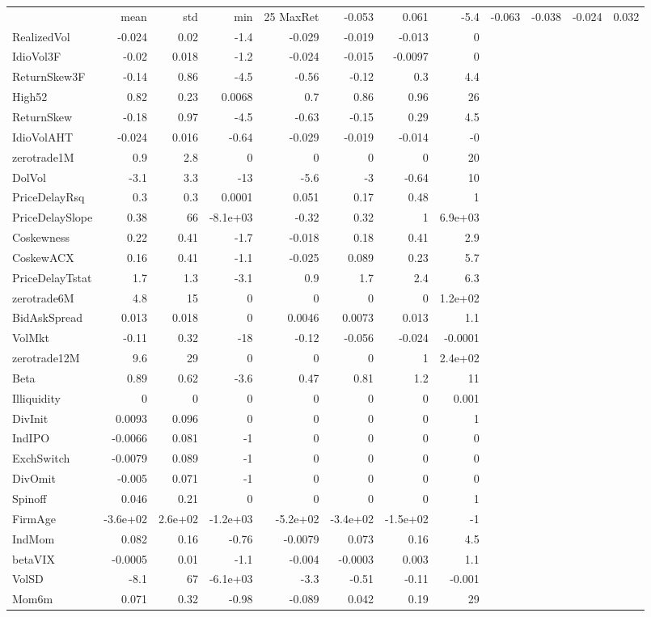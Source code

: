 \begin{tabular}{lrrrrrrr}
 & mean & std & min & 25%
MaxRet & -0.053 & 0.061 & -5.4 & -0.063 & -0.038 & -0.024 & 0.032 \\
RealizedVol & -0.024 & 0.02 & -1.4 & -0.029 & -0.019 & -0.013 & 0 \\
IdioVol3F & -0.02 & 0.018 & -1.2 & -0.024 & -0.015 & -0.0097 & 0 \\
ReturnSkew3F & -0.14 & 0.86 & -4.5 & -0.56 & -0.12 & 0.3 & 4.4 \\
High52 & 0.82 & 0.23 & 0.0068 & 0.7 & 0.86 & 0.96 & 26 \\
ReturnSkew & -0.18 & 0.97 & -4.5 & -0.63 & -0.15 & 0.29 & 4.5 \\
IdioVolAHT & -0.024 & 0.016 & -0.64 & -0.029 & -0.019 & -0.014 & -0 \\
zerotrade1M & 0.9 & 2.8 & 0 & 0 & 0 & 0 & 20 \\
DolVol & -3.1 & 3.3 & -13 & -5.6 & -3 & -0.64 & 10 \\
PriceDelayRsq & 0.3 & 0.3 & 0.0001 & 0.051 & 0.17 & 0.48 & 1 \\
PriceDelaySlope & 0.38 & 66 & -8.1e+03 & -0.32 & 0.32 & 1 & 6.9e+03 \\
Coskewness & 0.22 & 0.41 & -1.7 & -0.018 & 0.18 & 0.41 & 2.9 \\
CoskewACX & 0.16 & 0.41 & -1.1 & -0.025 & 0.089 & 0.23 & 5.7 \\
PriceDelayTstat & 1.7 & 1.3 & -3.1 & 0.9 & 1.7 & 2.4 & 6.3 \\
zerotrade6M & 4.8 & 15 & 0 & 0 & 0 & 0 & 1.2e+02 \\
BidAskSpread & 0.013 & 0.018 & 0 & 0.0046 & 0.0073 & 0.013 & 1.1 \\
VolMkt & -0.11 & 0.32 & -18 & -0.12 & -0.056 & -0.024 & -0.0001 \\
zerotrade12M & 9.6 & 29 & 0 & 0 & 0 & 1 & 2.4e+02 \\
Beta & 0.89 & 0.62 & -3.6 & 0.47 & 0.81 & 1.2 & 11 \\
Illiquidity & 0 & 0 & 0 & 0 & 0 & 0 & 0.001 \\
DivInit & 0.0093 & 0.096 & 0 & 0 & 0 & 0 & 1 \\
IndIPO & -0.0066 & 0.081 & -1 & 0 & 0 & 0 & 0 \\
ExchSwitch & -0.0079 & 0.089 & -1 & 0 & 0 & 0 & 0 \\
DivOmit & -0.005 & 0.071 & -1 & 0 & 0 & 0 & 0 \\
Spinoff & 0.046 & 0.21 & 0 & 0 & 0 & 0 & 1 \\
FirmAge & -3.6e+02 & 2.6e+02 & -1.2e+03 & -5.2e+02 & -3.4e+02 & -1.5e+02 & -1 \\
IndMom & 0.082 & 0.16 & -0.76 & -0.0079 & 0.073 & 0.16 & 4.5 \\
betaVIX & -0.0005 & 0.01 & -1.1 & -0.004 & -0.0003 & 0.003 & 1.1 \\
VolSD & -8.1 & 67 & -6.1e+03 & -3.3 & -0.51 & -0.11 & -0.001 \\
Mom6m & 0.071 & 0.32 & -0.98 & -0.089 & 0.042 & 0.19 & 29 \\
\end{tabular}
